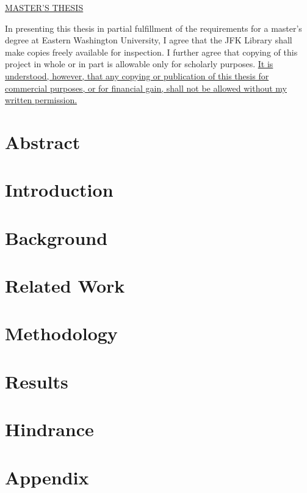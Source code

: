 \documentclass[12]{report}
\begin{document}
\newpage
\begin{center}
\underline{MASTER'S THESIS}\\
\end{center}
\begin{justify}
In presenting this thesis in partial fulfillment of the requirements for a master’s degree
at Eastern Washington University, I agree that the JFK Library shall make copies freely
available for inspection. I further agree that copying of this project in whole or in part
is allowable only for scholarly purposes. \ul{It is understood, however, that any copying or publication of this thesis for commercial purposes, or for financial gain, shall not be allowed without my written permission.}
\end{justify}
\begin{center}
\end{center}
\singlespace



\chapter{Abstract}


\tableofcontents
\listoffigures
\listoftables
{}

\chapter{Introduction}


\chapter{Background}


\chapter{Related Work}


\chapter{Methodology}



\chapter{Results}


\chapter{Hindrance}


\appendix
\chapter{Appendix}

\end{document}
